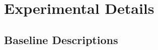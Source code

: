 \documentclass[11pt]{article}
\theoremstyle{plain}
\theoremstyle{definition}
\begin{document}





\section{Experimental Details}
\label{sec:appendix_details}

\subsection{Baseline Descriptions}
\end{document}
